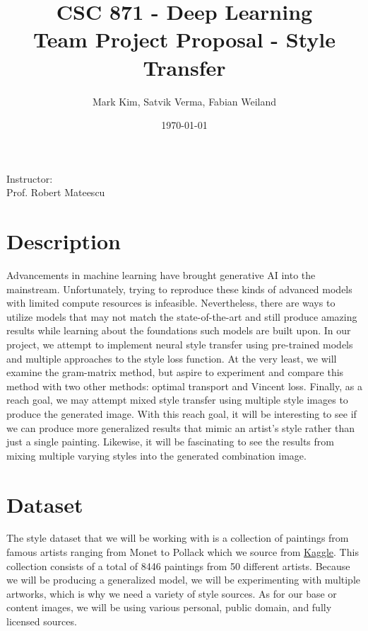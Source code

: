 \documentclass[12pt]{article}
\title{\textbf{CSC 871 - Deep Learning}\\\Large Team Project Proposal - Style Transfer}
\author{\large Mark Kim, Satvik Verma, Fabian Weiland}
\date{\today}
\begin{document}
\maketitle
\vspace{5mm}
\begin{center}
    Instructor:\\
    Prof. Robert Mateescu
\end{center}
\newpage

\section{Description}
Advancements in machine learning have brought generative AI into the mainstream.
Unfortunately, trying to reproduce these kinds of advanced models with limited
compute resources is infeasible.  Nevertheless, there are ways to utilize models
that may not match the state-of-the-art and still produce amazing results while
learning about the foundations such models are built upon.  In our project, we
attempt to implement neural style transfer using pre-trained models and multiple
approaches to the style loss function.  At the very least, we will examine the
gram-matrix method, but aspire to experiment and compare this method with two
other methods: optimal transport and Vincent loss.  Finally, as a reach goal, we
may attempt mixed style transfer using multiple style images to produce the
generated image.  With this reach goal, it will be interesting to see if we can
produce more generalized results that mimic an artist's style rather than just a
single painting.  Likewise, it will be fascinating to see the results from
mixing multiple varying styles into the generated combination image.

\section{Dataset}
The style dataset that we will be working with is a collection of paintings from famous
artists ranging from Monet to Pollack which we source from 
\href{https://www.kaggle.com/datasets/ikarus777/best-artworks-of-all-time}{Kaggle}.
This collection consists of a total of 8446 paintings from 50 different artists.
Because we will be producing a generalized model, we will be experimenting with
multiple artworks, which is why we need a variety of style sources.  As for our
base or content images, we will be using various personal, public domain, and
fully licensed sources.
\end{document}
